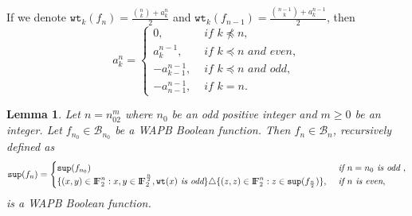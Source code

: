 \documentclass{article}[12pt]
\newtheorem{lemma}[theorem]{Lemma}
\newcommand{\FF}{{\rm I\!F}}
\newcommand{\CB}{\mathcal{B}}
\newcommand{\wt}{\mathtt{wt}}
\newcommand{\spt}{\mathtt{sup}}
\begin{document}
If we denote $\wt_k(f_n)= \frac{{n \choose k} + a_k^n}{2}$ and $\wt_k(f_{n-1})= \frac{{n-1 \choose k} + a_k^{n-1}}{2}$, then
$$a_k^n =
\begin{cases}
		0 ,   & \textit{ if }  k \npreceq n, \\
		a_k^{n-1},	& \textit{ if }  k \preceq n \textit{ and even}, \\
		-a_{k-1}^{n-1},	& \textit{ if }  k \preceq n \textit{ and odd}, \\
		-a_{n-1}^{n-1}, & \textit{ if }  k = n.
\end{cases}$$
\begin{lemma}\label{lem:WAPB_even}
Let $n = n_02^m$ where $n_0$ be an odd positive integer and $m \geq 0$ be an integer. Let $f_{n_0} \in \CB_{n_0}$ be a WAPB Boolean function. Then $f_n \in \CB_n$, recursively defined as 
	$$\spt(f_n)=
	\begin{cases} 
	\spt(f_{n_0}) & \textit{ if } n = n_0 \textit{ is odd }, \\
	\{(x,y) \in \FF_2^n : x,y \in \FF_2^{\frac{n}{2}}, \wt(x) \textit{ is odd}\} \triangle \{(z,z) \in \FF_2^n : z \in \spt(f_{\frac{n}{2}})\}, & \textit{ if } n \textit{ is even},
	\end{cases}$$
	is a WAPB Boolean function.
\end{lemma}
\end{document}
